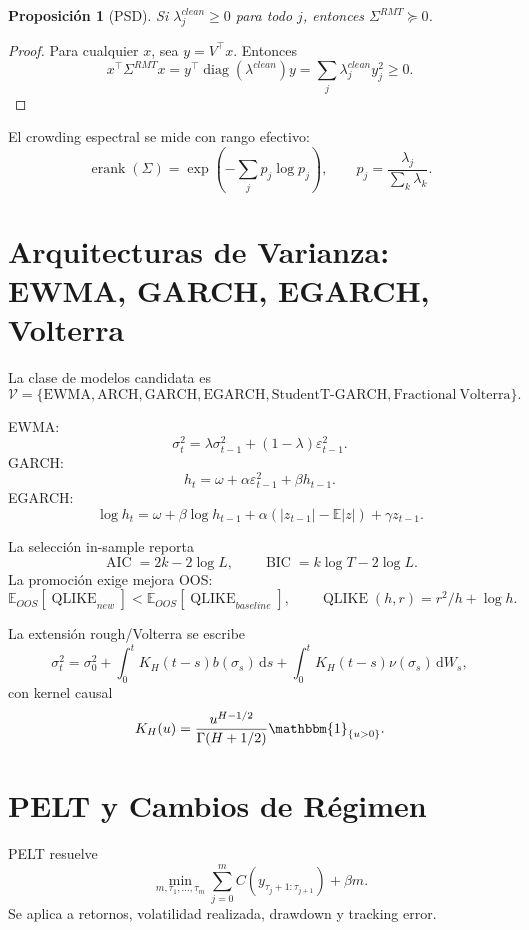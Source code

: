 \documentclass[11pt,letterpaper]{article}
\newtheorem{proposition}{Proposición}
\DeclareMathOperator{\diag}{diag}
\DeclareMathOperator{\erank}{erank}
\DeclareMathOperator{\AIC}{AIC}
\DeclareMathOperator{\BIC}{BIC}
\DeclareMathOperator{\QLIKE}{QLIKE}
\newcommand{\E}{\mathbb{E}}
\newcommand{\1}{\mathbbm{1}}
\newcommand{\dd}{\,\mathrm{d}}
\begin{document}
\begin{proposition}[PSD]
Si \(\lambda_j^{clean}\ge0\) para todo \(j\), entonces \(\Sigma^{RMT}\succeq0\).
\end{proposition}

\begin{proof}
Para cualquier \(x\), sea \(y=V^\top x\). Entonces
\[
x^\top\Sigma^{RMT}x
=y^\top\diag(\lambda^{clean})y
=\sum_j\lambda_j^{clean}y_j^2\ge0.
\]
\end{proof}

El crowding espectral se mide con rango efectivo:
\[
  \erank(\Sigma)
  =
  \exp\left(
  -\sum_j p_j\log p_j
  \right),
  \qquad
  p_j=\frac{\lambda_j}{\sum_k\lambda_k}.
\]

\section{Arquitecturas de Varianza: EWMA, GARCH, EGARCH, Volterra}

La clase de modelos candidata es
\[
  \mathcal{V}
  =
  \{\mathrm{EWMA},\mathrm{ARCH},\mathrm{GARCH},
  \mathrm{EGARCH},\mathrm{StudentT\text{-}GARCH},
  \mathrm{Fractional\ Volterra}\}.
\]

EWMA:
\[
  \sigma_t^2
  =
  \lambda\sigma_{t-1}^2+(1-\lambda)\varepsilon_{t-1}^2.
\]
GARCH:
\[
  h_t=\omega+\alpha\varepsilon_{t-1}^2+\beta h_{t-1}.
\]
EGARCH:
\[
\log h_t
=
\omega+\beta\log h_{t-1}
+\alpha(|z_{t-1}|-\E|z|)
+\gamma z_{t-1}.
\]

La selección in-sample reporta
\[
  \AIC=2k-2\log L,\qquad
  \BIC=k\log T-2\log L.
\]
La promoción exige mejora OOS:
\[
  \E_{OOS}[\QLIKE_{new}]<
  \E_{OOS}[\QLIKE_{baseline}],
  \qquad
  \QLIKE(h,r)=r^2/h+\log h.
\]

La extensión rough/Volterra se escribe
\[
\sigma_t^2
=
\sigma_0^2
+\int_0^t K_H(t-s)b(\sigma_s)\dd s
+\int_0^t K_H(t-s)\nu(\sigma_s)\dd W_s,
\]
con kernel causal
\[
K_H(u)=\frac{u^{H-1/2}}{\Gamma(H+1/2)}\1_{\{u>0\}}.
\]

\section{PELT y Cambios de Régimen}

PELT resuelve
\[
\min_{m,\tau_1,\dots,\tau_m}
\sum_{j=0}^{m}
C(y_{\tau_j+1:\tau_{j+1}})
+\beta m.
\]
Se aplica a retornos, volatilidad realizada, drawdown y tracking error.
\end{document}
